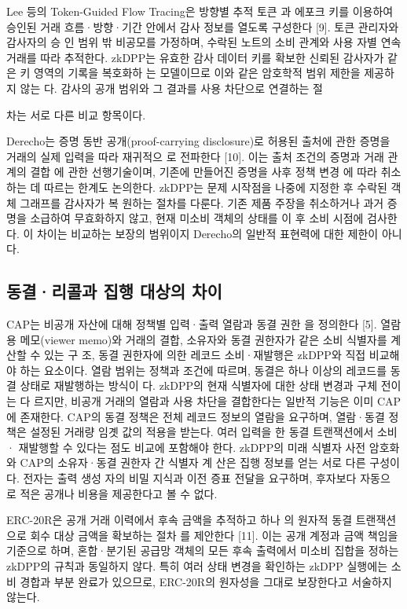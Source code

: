 Lee 등의 Token-Guided Flow Tracing은 방향별 추적 토큰
과 에포크 키를 이용하여 승인된 거래 흐름·방향·기간 안에서
감사 정보를 열도록 구성한다 [9]. 토큰 관리자와 감사자의 승
인 범위 밖 비공모를 가정하며, 수락된 노트의 소비 관계와 사용
자별 연속 거래를 따라 추적한다. zkDPP는 유효한 감사 데이터
키를 확보한 신뢰된 감사자가 같은 키 영역의 기록을 복호화하
는 모델이므로 이와 같은 암호학적 범위 제한을 제공하지 않는
다. 감사의 공개 범위와 그 결과를 사용 차단으로 연결하는 절

차는 서로 다른 비교 항목이다.

Derecho는 증명 동반 공개(proof-carrying disclosure)로
허용된 출처에 관한 증명을 거래의 실제 입력을 따라 재귀적으
로 전파한다 [10]. 이는 출처 조건의 증명과 거래 관계의 결합
에 관한 선행기술이며, 기존에 만들어진 증명을 사후 정책 변경
에 따라 취소하는 데 따르는 한계도 논의한다. zkDPP는 문제
시작점을 나중에 지정한 후 수락된 객체 그래프를 감사자가 복
원하는 절차를 다룬다. 기존 제품 주장을 취소하거나 과거 증
명을 소급하여 무효화하지 않고, 현재 미소비 객체의 상태를 이
후 소비 시점에 검사한다. 이 차이는 비교하는 보장의 범위이지
Derecho의 일반적 표현력에 대한 제한이 아니다.

\subsection{동결·리콜과 집행 대상의 차이}
CAP는 비공개 자산에 대해 정책별 입력·출력 열람과 동결 권한
을 정의한다 [5]. 열람용 메모(viewer memo)와 거래의 결합,
소유자와 동결 권한자가 같은 소비 식별자를 계산할 수 있는 구
조, 동결 권한자에 의한 레코드 소비·재발행은 zkDPP와 직접
비교해야 하는 요소이다. 열람 범위는 정책과 조건에 따르며,
동결은 하나 이상의 레코드를 동결 상태로 재발행하는 방식이
다. zkDPP의 현재 식별자에 대한 상태 변경과 구체 전이는 다
르지만, 비공개 거래의 열람과 사용 차단을 결합한다는 일반적
기능은 이미 CAP에 존재한다. CAP의 동결 정책은 전체 레코드
정보의 열람을 요구하며, 열람·동결 정책은 설정된 거래량 임곗
값의 적용을 받는다. 여러 입력을 한 동결 트랜잭션에서 소비·
재발행할 수 있다는 점도 비교에 포함해야 한다. zkDPP의 미래
식별자 사전 암호화와 CAP의 소유자·동결 권한자 간 식별자 계
산은 집행 정보를 얻는 서로 다른 구성이다. 전자는 출력 생성
자의 비밀 지식과 이전 증표 전달을 요구하며, 후자보다 자동으
로 적은 공개나 비용을 제공한다고 볼 수 없다.

ERC-20R은 공개 거래 이력에서 후속 금액을 추적하고 하나
의 원자적 동결 트랜잭션으로 회수 대상 금액을 확보하는 절차
를 제안한다 [11]. 이는 공개 계정과 금액 책임을 기준으로 하며,
혼합·분기된 공급망 객체의 모든 후속 출력에서 미소비 집합을
정하는 zkDPP의 규칙과 동일하지 않다. 특히 여러 상태 변경을
확인하는 zkDPP 실행에는 소비 경합과 부분 완료가 있으므로,
ERC-20R의 원자성을 그대로 보장한다고 서술하지 않는다.


